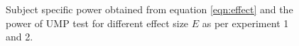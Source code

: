 \documentclass{article}
\begin{document}
\begin{figure}[hbtp]
   \centering
       \caption{Subject specific power obtained from equation \ref{eqn:effect} and the power of UMP test for different effect size $E$ as per experiment 1 and 2.}
       \label{fig:power_effect_subject1}
\end{figure}
\end{document}
